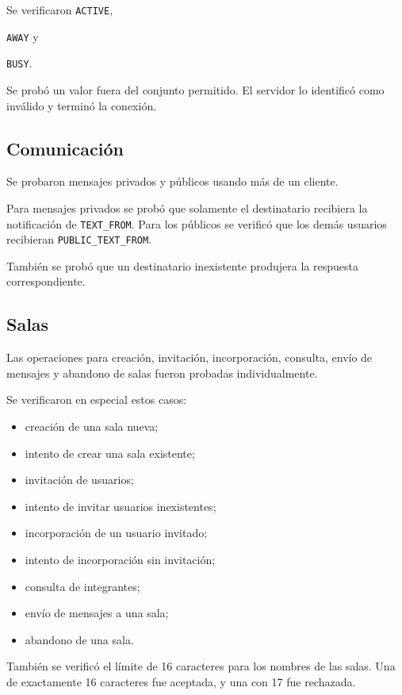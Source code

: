 \documentclass[12pt,letterpaper]{article}
\begin{document}
Se verificaron \texttt{ACTIVE}, \item \texttt{AWAY} y \item \texttt{BUSY}.

Se probó un valor fuera del conjunto permitido. El servidor lo identificó como inválido y terminó la conexión.

\subsection{Comunicación}

Se probaron mensajes privados y públicos usando más de un cliente.

Para mensajes privados se probó que solamente el destinatario recibiera la notificación de \texttt{TEXT\_FROM}. Para los públicos se verificó que los demás usuarios recibieran \texttt{PUBLIC\_TEXT\_FROM}.

También se probó que un destinatario inexistente produjera la respuesta correspondiente.

\subsection{Salas}

Las operaciones para creación, invitación, incorporación, consulta, envío de
mensajes y abandono de salas fueron probadas individualmente.

Se verificaron en especial estos casos:

\begin{itemize}
    \item creación de una sala nueva;
    \item intento de crear una sala existente;
    \item invitación de usuarios;
    \item intento de invitar usuarios inexistentes;
    \item incorporación de un usuario invitado;
    \item intento de incorporación sin invitación;
    \item consulta de integrantes;
    \item envío de mensajes a una sala;
    \item abandono de una sala.
\end{itemize}

También se verificó el límite de 16 caracteres para los nombres de las salas.
Una de exactamente 16 caracteres fue aceptada, y una con 17 fue rechazada.
\end{document}
